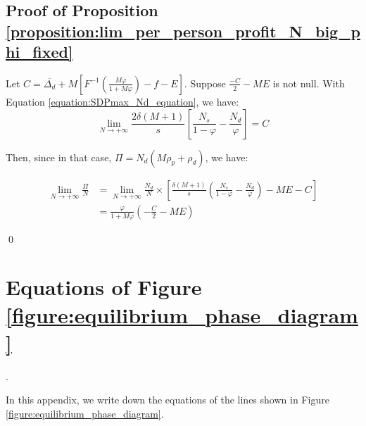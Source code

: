 \documentclass[english, a4paper]{article}
\theoremstyle{plain}
\theoremstyle{definition}
\theoremstyle{remark}
\begin{document}
\subsection{Proof of Proposition \ref{proposition:lim_per_person_profit_N_big_phi_fixed}}
\label{proof:lim_per_person_profit_N_big_phi_fixed}

Let $C = \overline{\Delta_d} + M \left[ F^{-1}\left(\frac{M\varphi}{1 + M\varphi}\right) - f - E \right]$. Suppose $\frac{-C}{2} - ME$ is not null. With Equation \ref{equation:SDPmax_Nd_equation}, we have:
\begin{equation*}
    \lim_{N\rightarrow +\infty} \frac{2\delta(M + 1)}{s} \left[ \frac{N_s}{1 - \varphi} - \frac{N_d}{\varphi} \right] = C
\end{equation*}

Then, since in that case, $\Pi = N_d(M\rho_p + \rho_d)$, we have:

\begin{align*}
    \lim_{N \rightarrow +\infty} \frac{\Pi}{N}& = \lim_{N\rightarrow +\infty} \frac{N_d}{N} \times \left[ \frac{\delta(M + 1)}{s} \left(\frac{N_s}{1 - \varphi} - \frac{N_d}{\varphi} \right) -ME - C \right]\\
    & = \frac{\varphi}{1 + M\varphi} \left( -\frac{C}{2} - ME \right)
\end{align*}

\qed

\section{Equations of Figure \ref{figure:equilibrium_phase_diagram}}
\label{appendix:phase_diagram_equations}.

In this appendix, we write down the equations of the lines shown in Figure \ref{figure:equilibrium_phase_diagram}.
\end{document}
